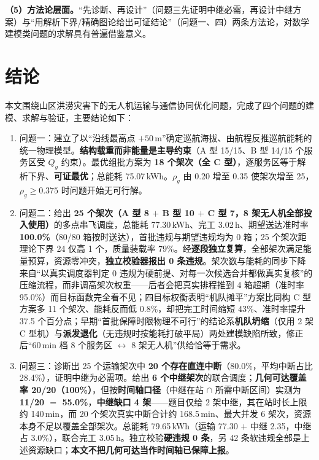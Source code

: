 \textbf{（5）方法论层面。}“先诊断、再设计”（问题三先证明中继必需，再设计中继方案）与“用解析下界/精确图论给出可证结论”（问题一、四）两条方法论，对数学建模类问题的求解具有普遍借鉴意义。

\section{结论}

本文围绕山区洪涝灾害下的无人机运输与通信协同优化问题，完成了四个问题的建模、求解与验证，主要结论如下：

\begin{enumerate}[label=\textbf{结论 \arabic*}]
	\item 问题一：建立了以“沿线最高点 $+50$\,m”确定巡航海拔、由航程反推巡航能耗的统一物理模型。\textbf{结构载重而非能量是主导约束}（A 型 15/15、B 型 14/15 个服务区受 $Q_{g}$ 约束）。最优组批方案为 \textbf{18 个架次（全 C 型）}，逐服务区等于解析下界、\textbf{可证最优}；总能耗 75.07\,kWh。$\rho_{g}$ 由 0.20 增至 0.35 使架次增至 25，$\rho_{g}\ge0.375$ 时问题开始无可行解。
	\item 问题二：给出 \textbf{25 个架次（A 型 8 $+$ B 型 10 $+$ C 型 7，8 架无人机全部投入使用）}的多点串飞调度，总能耗 77.30\,kWh、完工 3.02\,h、期望送达准时率 \textbf{100.0\%}（80/80 箱按时送达），首批违规与期望违规均为 0 箱；25 个架次距理论下界 24 仅高 1 个，质量装载率 79\%。经\textbf{逐段独立复算}，全部架次满足能量预算，资源零冲突，\textbf{独立校验器报出 0 条违规}。架次数与能耗的同步下降来自“以真实调度器判定 0 违规为硬前提、对每一次候选合并都做真实复核”的压缩流程，而非调高架次权重——后者会把真实排程推到 4 箱超期（准时率 95.0\%）而目标函数完全看不见；四目标权衡表明“机队摊平”方案比同构 C 型方案多 11 个架次、能耗反而低 0.8\%，却把完工时间缩短 43\%、准时率提升 37.5 个百分点；早期“首批保障时限物理不可行”的结论系\textbf{机队坍缩}（仅用 2 架 C 型机）与\textbf{派发退化}（无违规时按能耗打破平局）两处建模缺陷所致，修正后“60\,min 档 8 个服务区 $\leftrightarrow$ 8 架无人机”供给恰等于需求。
	\item 问题三：诊断出 25 个运输架次中 \textbf{20 个存在直连中断}（80.0\%，平均中断占比 28.4\%），证明中继为必需项。给出 \textbf{6 个中继架次}的联合调度；\textbf{几何可达覆盖率 20/20（100\%）}，但按\textbf{时间轴口径}（中继在站 $\cap$ 所需中断区间）实测为 \textbf{11/20 $=$ 55.0\%}，\textbf{中继缺口 4 架}——题目仅给 2 架中继，其在站时长上限约 140\,min，而 20 个架次真实中断合计约 168.5\,min、最大并发 6 架次，资源本身不足以覆盖全部架次。总能耗 79.65\,kWh（运输 77.30 $+$ 中继 2.35，中继占 3.0\%），联合完工 3.05\,h。独立校验\textbf{硬违规 0 条}，另 42 条软违规全部是上述资源缺口；\textbf{本文不把几何可达当作时间轴已保障上报}。

\end{enumerate}
